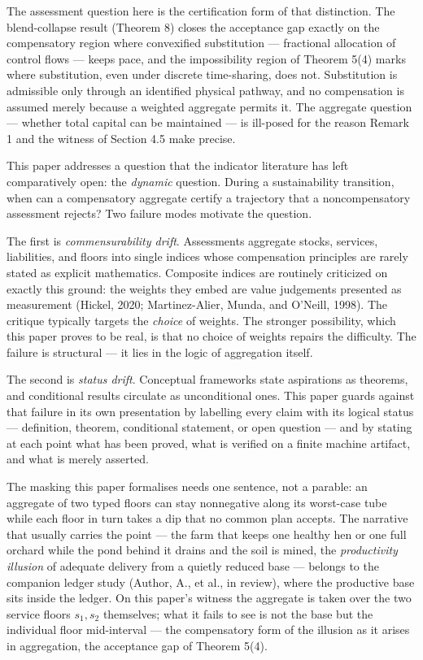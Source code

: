 \documentclass[11pt]{article}
\begin{document}
The assessment question here is the certification form of that
distinction. The blend-collapse result (Theorem 8) closes the acceptance
gap exactly on the compensatory region where convexified substitution
--- fractional allocation of control flows --- keeps pace, and the
impossibility region of Theorem 5(4) marks where substitution, even
under discrete time-sharing, does not. Substitution is admissible only
through an identified physical pathway, and no compensation is assumed
merely because a weighted aggregate permits it. The aggregate question
--- whether total capital can be maintained --- is ill-posed for the
reason Remark 1 and the witness of Section 4.5 make precise.

This paper addresses a question that the indicator literature has left
comparatively open: the \emph{dynamic} question. During a sustainability
transition, when can a compensatory aggregate certify a trajectory that
a noncompensatory assessment rejects? Two failure modes motivate the
question.

The first is \emph{commensurability drift}. Assessments aggregate
stocks, services, liabilities, and floors into single indices whose
compensation principles are rarely stated as explicit mathematics.
Composite indices are routinely criticized on exactly this ground: the
weights they embed are value judgements presented as measurement
(Hickel, 2020; Martinez-Alier, Munda, and O'Neill, 1998). The critique
typically targets the \emph{choice} of weights. The stronger
possibility, which this paper proves to be real, is that no choice of
weights repairs the difficulty. The failure is structural --- it lies in
the logic of aggregation itself.

The second is \emph{status drift}. Conceptual frameworks state
aspirations as theorems, and conditional results circulate as
unconditional ones. This paper guards against that failure in its own
presentation by labelling every claim with its logical status ---
definition, theorem, conditional statement, or open question --- and by
stating at each point what has been proved, what is verified on a finite
machine artifact, and what is merely asserted.

The masking this paper formalises needs one sentence, not a parable: an
aggregate of two typed floors can stay nonnegative along its worst-case
tube while each floor in turn takes a dip that no common plan accepts.
The narrative that usually carries the point --- the farm that keeps one
healthy hen or one full orchard while the pond behind it drains and the
soil is mined, the \emph{productivity illusion} of adequate delivery
from a quietly reduced base --- belongs to the companion ledger study
(Author, A., et al., in review), where the productive base sits inside
the ledger. On this paper's witness the aggregate is taken over the two
service floors \(s_1, s_2\) themselves; what it fails to see is not the
base but the individual floor mid-interval --- the compensatory form of
the illusion as it arises in aggregation, the acceptance gap of Theorem
5(4).
\end{document}
